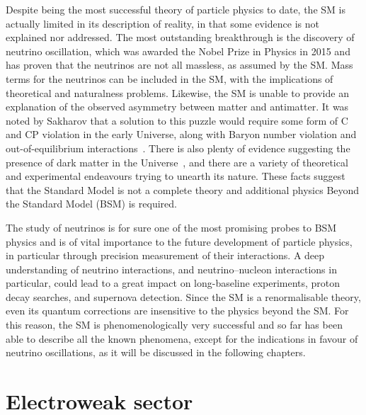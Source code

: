 Despite being the most successful theory of particle physics to date, the SM is actually limited %
in its description of reality, in that some evidence is not explained nor addressed.
The most outstanding breakthrough is the discovery of neutrino oscillation, which was awarded the Nobel Prize in Physics in 2015 %
and has proven that the neutrinos are not all massless, as assumed by the SM.	%
Mass terms for the neutrinos can be included in the SM, with the implications of theoretical and naturalness problems.
Likewise, the SM is unable to provide an explanation of the observed asymmetry between matter and antimatter.
It was noted by Sakharov that a solution to this puzzle would require some form of C and CP violation %
in the early Universe, along with Baryon number violation and out-of-equilibrium interactions~\cite{Sakharov:1967dj}.
There is also plenty of evidence suggesting the presence of dark matter %
in the Universe~\cite{Zwicky:1933gu, Rubin:1970zza, Aghanim:2018eyx}, %
and there are a variety of theoretical and experimental endeavours trying to unearth its nature.
These facts suggest that the Standard Model is not a complete theory and additional physics %
Beyond the Standard Model (BSM) is required.

The study of neutrinos is for sure one of the most promising probes to BSM physics and %
is of vital importance to the future development of particle physics, %
in particular through precision measurement of their interactions.
A deep understanding of neutrino interactions, and neutrino--nucleon interactions in particular, %
could lead to a great impact on long-baseline experiments, proton decay searches, and supernova detection.
Since the SM is a renormalisable theory, even its quantum corrections are insensitive to the physics beyond the SM.
For this reason, the SM is phenomenologically very successful and so far has been able to describe all the known
phenomena, except for the indications in favour of neutrino oscillations, as it will be discussed in the following chapters.

\section{Electroweak sector}
\label{sec:ew_sector}

